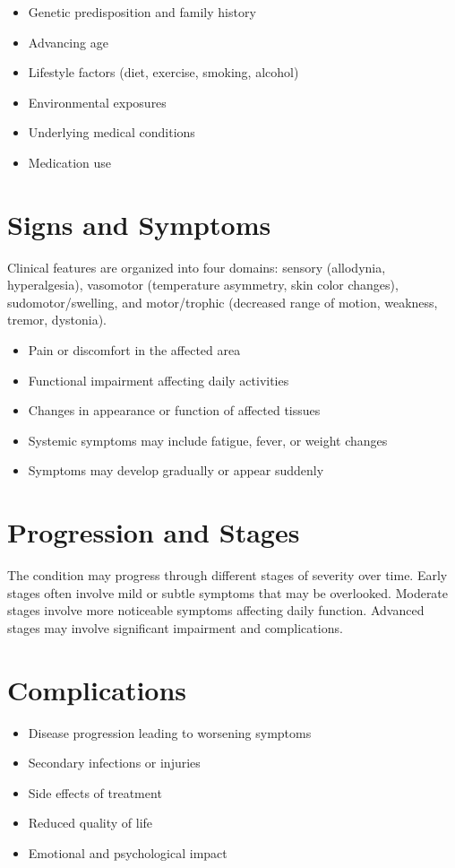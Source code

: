 \begin{itemize}[noitemsep]
  \item Genetic predisposition and family history
  \item Advancing age
  \item Lifestyle factors (diet, exercise, smoking, alcohol)
  \item Environmental exposures
  \item Underlying medical conditions
  \item Medication use
\end{itemize}
\section{Signs and Symptoms}
Clinical features are organized into four domains: sensory (allodynia, hyperalgesia), vasomotor (temperature asymmetry, skin color changes), sudomotor/swelling, and motor/trophic (decreased range of motion, weakness, tremor, dystonia).

\begin{itemize}[noitemsep]
  \item Pain or discomfort in the affected area
  \item Functional impairment affecting daily activities
  \item Changes in appearance or function of affected tissues
  \item Systemic symptoms may include fatigue, fever, or weight changes
  \item Symptoms may develop gradually or appear suddenly
\end{itemize}
\section{Progression and Stages}
The condition may progress through different stages of severity over time. Early stages often involve mild or subtle symptoms that may be overlooked. Moderate stages involve more noticeable symptoms affecting daily function. Advanced stages may involve significant impairment and complications.
\section{Complications}
\begin{itemize}[noitemsep]
  \item Disease progression leading to worsening symptoms
  \item Secondary infections or injuries
  \item Side effects of treatment
  \item Reduced quality of life
  \item Emotional and psychological impact
\end{itemize}
